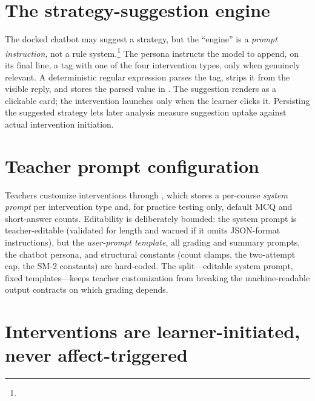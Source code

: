 \section{The strategy-suggestion engine}
\label{sec:interventions-suggest}

The docked chatbot may suggest a strategy, but the ``engine'' is a
\emph{prompt instruction}, not a rule
system.\footnote{} The
persona instructs the model to append, on its final line, a tag
 with  one of the four intervention types,
only when genuinely relevant. A deterministic regular expression parses
the tag, strips it from the visible reply, and stores the parsed value in
. The suggestion renders as a
clickable card; the intervention launches only when the learner clicks it.
Persisting the suggested strategy lets later analysis measure suggestion
uptake against actual intervention initiation.

\section{Teacher prompt configuration}
\label{sec:interventions-teacher}

Teachers customize interventions through ,
which stores a per-course \emph{system prompt} per intervention type and,
for practice testing only, default MCQ and short-answer counts.
Editability is deliberately bounded: the system prompt is teacher-editable
(validated for length and warned if it omits JSON-format instructions),
but the \emph{user-prompt template}, all grading and summary prompts, the
chatbot persona, and structural constants (count clamps, the two-attempt
cap, the SM-2 constants) are hard-coded. The split---editable system
prompt, fixed templates---keeps teacher customization from breaking the
machine-readable output contracts on which grading depends.

\section{Interventions are learner-initiated, never affect-triggered}
\label{sec:interventions-autotrigger}

